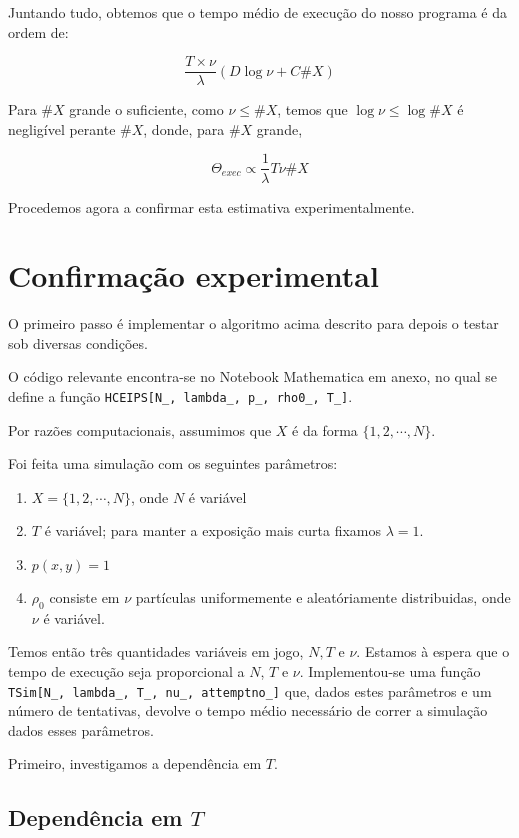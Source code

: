 \documentclass{article}
\begin{document}
	Juntando tudo, obtemos que o tempo médio de execução do nosso programa é da ordem de:
	
	\[\frac{T \times \nu}\lambda (D \log \nu + C \#X)\]
	
	Para $\#X$ grande o suficiente, como $\nu \leq \#X$, temos que $\log \nu \leq \log \#X$ é negligível perante $\#X$, donde, para $\#X$ grande,
	
	\[\Theta_{exec} \propto \frac 1 \lambda T \nu \#\!X\]
	
	Procedemos agora a confirmar esta estimativa experimentalmente.
	
	\section{Confirmação experimental}
	
	O primeiro passo é implementar o algoritmo acima descrito para depois o testar sob diversas condições.
	
	O código relevante encontra-se no Notebook Mathematica em anexo, no qual se define a função \texttt{HCEIPS[N\_, lambda\_, p\_, rho0\_, T\_]}.
	
	Por razões computacionais, assumimos que $X$ é da forma $\{1, 2, \cdots, N\}$.
	
	Foi feita uma simulação com os seguintes parâmetros:
	
	\begin{enumerate}
	\item $X = \{1, 2, \cdots, N\}$, onde $N$ é variável
	
	\item $T$ é variável; para manter a exposição mais curta fixamos $\lambda = 1$.
	
	\item $p(x,y) = 1$
	
	\item $\rho_0$ consiste em $\nu$ partículas uniformemente e aleatóriamente distribuidas, onde $\nu$ é variável.
	\end{enumerate}
	
	Temos então três quantidades variáveis em jogo, $N, T$ e $\nu$. Estamos à espera que o tempo de execução seja proporcional a $N$, $T$ e $\nu$. Implementou-se uma função \texttt{TSim[N\_, lambda\_, T\_, nu\_, attemptno\_]} que, dados estes parâmetros e um número de tentativas, devolve o tempo médio necessário de correr a simulação dados esses parâmetros.
	
	Primeiro, investigamos a dependência em $T$.
	
	\subsection{Dependência em $T$}
	
\end{document}
